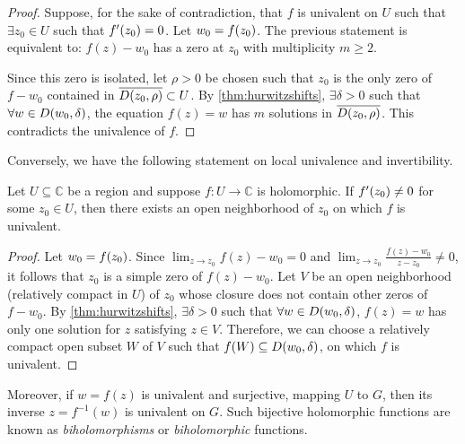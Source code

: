 \begin{proof}
    Suppose, for the sake of contradiction, that \(f\) is univalent on \(U\) such that \(\exists z_0\in U\) such that \(f'\qty(z_0)=0\). Let \(w_0=f\qty(z_0)\). The previous statement is equivalent to: \(f(z)-w_0\) has a zero at \(z_0\) with multiplicity \(m\geq 2\).

    Since this zero is isolated, let \(\rho>0\) be chosen such that \(z_0\) is the only zero of \(f-w_0\) contained in \(\overline{D\qty(z_0,\rho)}\subset U\). By \cref{thm:hurwitzshifts}, \(\exists \delta>0\) such that \(\forall w\in D\qty(w_0,\delta)\), the equation \(f(z)=w\) has \(m\) solutions in \(\overline{D\qty(z_0,\rho)}\). This contradicts the univalence of \(f\).
\end{proof}
Conversely, we have the following statement on local univalence and invertibility.
\begin{theorem}\label{thm:nonvanishingderivativeunivalentonneighborhood}
    Let \(U\subseteq\mathbb{C}\) be a region and suppose \(f:U\to\mathbb{C}\) is holomorphic. If \(f'\qty(z_0)\neq0\) for some \(z_0\in U\), then there exists an open neighborhood of \(z_0\) on which \(f\) is univalent.
\end{theorem}
\begin{proof}
    Let \(w_0=f\qty(z_0)\). Since \(\lim_{z\to z_0}f(z)-w_0=0\) and \(\lim_{z\to z_0}\frac{f(z)-w_0}{z-z_0}\neq0\), it follows that \(z_0\) is a simple zero of \(f(z)-w_0\). Let \(V\) be an open neighborhood (relatively compact in \(U\)) of \(z_0\) whose closure does not contain other zeros of \(f-w_0\). By \cref{thm:hurwitzshifts}, \(\exists\delta>0\) such that \(\forall w\in D\qty(w_0,\delta)\), \(f(z)=w\) has only one solution for \(z\) satisfying \(z\in V\). Therefore, we can choose a relatively compact open subset \(W\) of \(V\) such that \(f\qty(W)\subseteq D\qty(w_0,\delta)\), on which \(f\) is univalent.
\end{proof}
Moreover, if \(w=f(z)\) is univalent and surjective, mapping \(U\) to \(G\), then its inverse \(z=f^{-1}(w)\) is univalent on \(G\). Such bijective holomorphic functions are known as \textit{biholomorphisms} or \textit{biholomorphic} functions.

